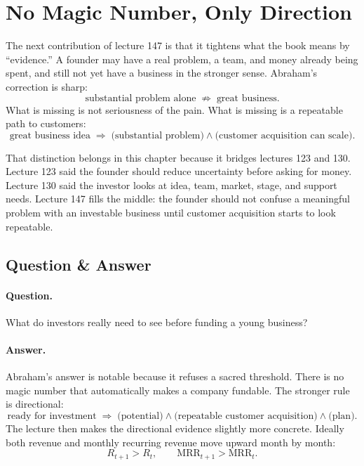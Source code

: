 \documentclass[11pt,oneside]{book}
\begin{document}
\section{No Magic Number, Only Direction}

The next contribution of lecture 147 is that it tightens what the book means by ``evidence.'' A founder may have a real problem, a team, and money already being spent, and still not yet have a business in the stronger sense. Abraham's correction is sharp:
\[
\text{substantial problem alone}
\;\not\Rightarrow\;
\text{great business}.
\]
What is missing is not seriousness of the pain. What is missing is a repeatable path to customers:
\[
\text{great business idea}
\;\Rightarrow\;
\bigl(\text{substantial problem}\bigr)
\land
\bigl(\text{customer acquisition can scale}\bigr).
\]

That distinction belongs in this chapter because it bridges lectures 123 and 130. Lecture 123 said the founder should reduce uncertainty before asking for money. Lecture 130 said the investor looks at idea, team, market, stage, and support needs. Lecture 147 fills the middle: the founder should not confuse a meaningful problem with an investable business until customer acquisition starts to look repeatable.

\subsection{Question \& Answer}

\paragraph{Question.}
What do investors really need to see before funding a young business?

\paragraph{Answer.}
Abraham's answer is notable because it refuses a sacred threshold. There is no magic number that automatically makes a company fundable. The stronger rule is directional:
\[
\text{ready for investment}
\;\Rightarrow\;
\bigl(\text{potential}\bigr)
\land
\bigl(\text{repeatable customer acquisition}\bigr)
\land
\bigl(\text{plan}\bigr).
\]
The lecture then makes the directional evidence slightly more concrete. Ideally both revenue and monthly recurring revenue move upward month by month:
\[
R_{t+1}>R_t,
\qquad
\mathrm{MRR}_{t+1}>\mathrm{MRR}_t.
\]
\end{document}
